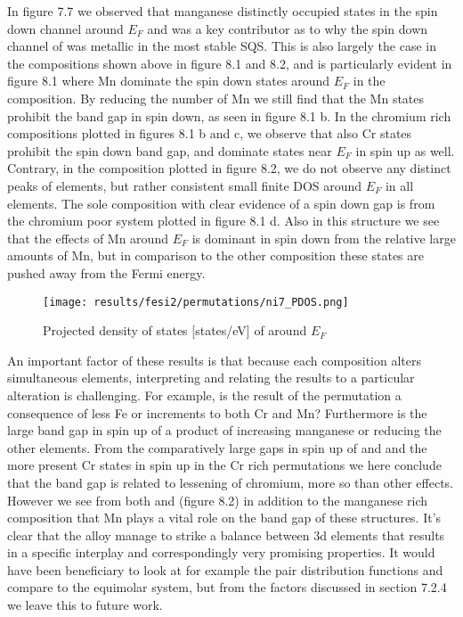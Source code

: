 In figure 7.7 we observed that manganese distinctly occupied states in the spin down channel around $E_F$ and was a key contributor as to why the spin down channel of  was metallic in the most stable SQS. This is also largely the case in the compositions shown above in figure 8.1 and 8.2, and is particularly evident in figure 8.1 where Mn dominate the spin down states around $E_F$ in the  composition. By reducing the number of Mn we still find that the Mn states prohibit the band gap in spin down, as seen in figure 8.1 b. In the chromium rich compositions plotted in figures 8.1 b and c, we observe that also Cr states prohibit the spin down band gap, and dominate states near $E_F$ in spin up as well. Contrary, in the  composition plotted in figure 8.2, we do not observe any distinct peaks of elements, but rather consistent small finite DOS around $E_F$ in all elements.  The sole composition with clear evidence of a spin down gap is from the chromium poor system plotted in figure 8.1 d. Also in this structure we see that the effects of Mn around $E_F$ is dominant in spin down from the relative large amounts of Mn, but in comparison to the other composition these states are pushed away from the Fermi energy.

\begin{figure}[H]
	\centering
	\texttt{[image: results/fesi2/permutations/ni7\_PDOS.png]}
	\caption{Projected density of states [states/eV] of  around $E_F$}
\end{figure}

An important factor of these results is that because each composition alters simultaneous elements, interpreting and relating the results to a particular alteration is challenging. For example, is the result of the  permutation a consequence of less Fe or increments to both Cr and Mn? Furthermore is the large band gap in spin up of  a product of increasing manganese or reducing the other elements. From the comparatively large gaps in spin up of  and  and the more present Cr states in spin up in the Cr rich permutations we here conclude that the band gap is related to lessening of chromium, more so than other effects. However we see from both  and  (figure 8.2) in addition to the manganese rich composition that Mn plays a vital role on the band gap of these structures. It's clear that the  alloy manage to strike a balance between 3d elements that results in a specific interplay and correspondingly very promising properties. It would have been beneficiary to look at for example the pair distribution functions and compare to the equimolar system, but from the factors discussed in section 7.2.4 we leave this to future work. 

